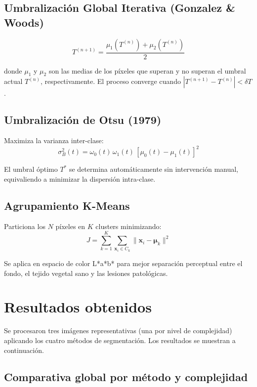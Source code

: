 \documentclass[11pt,a4paper]{article}
\begin{document}
\subsection{Umbralización Global Iterativa (Gonzalez \& Woods)}

\[
T^{(n+1)} = \frac{\mu_1(T^{(n)}) + \mu_2(T^{(n)})}{2}
\]

donde $\mu_1$ y $\mu_2$ son las medias de los píxeles que superan y no
superan el umbral actual $T^{(n)}$, respectivamente. El proceso converge
cuando $|T^{(n+1)} - T^{(n)}| < \delta T$.

\subsection{Umbralización de Otsu (1979)}

Maximiza la varianza inter-clase:
\[
\sigma_B^2(t) = \omega_0(t)\,\omega_1(t)\,[\mu_0(t) - \mu_1(t)]^2
\]

El umbral óptimo $T^*$ se determina automáticamente sin intervención manual,
equivaliendo a minimizar la dispersión intra-clase.

\subsection{Agrupamiento K-Means}

Particiona los $N$ píxeles en $K$ clusters minimizando:
\[
J = \sum_{k=1}^{K} \sum_{\mathbf{x}_i \in C_k} \|\mathbf{x}_i - \boldsymbol{\mu}_k\|^2
\]

Se aplica en espacio de color L*a*b* para mejor separación perceptual entre
el fondo, el tejido vegetal sano y las lesiones patológicas.

\section{Resultados obtenidos}

Se procesaron tres imágenes representativas (una por nivel de complejidad)
aplicando los cuatro métodos de segmentación. Los resultados se muestran a
continuación.

\subsection{Comparativa global por método y complejidad}
\end{document}
